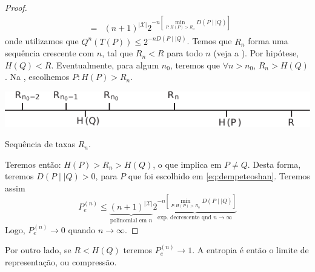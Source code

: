 \begin{proof}
\begin{subequations}
\begin{align}
        &=& (n+1)^{\vert \mathcal{X} \vert} 2^{-n [\min_{P: H(P) > R_n} D(P \mid\mid Q)]} \label{eq:dempeteoshan}
  \end{align}
\end{subequations}
onde utilizamos que $Q^n(T(P)) \leq 2^{-n D(P\mid \mid Q)}$.
Temos que $R_n$ forma uma sequência crescente com $n$, tal que $R_n < R$ para todo $n$ (veja a ).
Por hipótese, $H(Q) < R$. Eventualmente, para algum $n_0$, teremos que $\forall n > n_0$, $R_n > H(Q)$.
Na , escolhemos $P: H(P) > R_n$.
\begin{marginfigure}%
  \includegraphics[width=\linewidth]{figures/Rn-seq.pdf}
  \caption{Sequência de taxas $R_n$.}
  \label{fig:Rn-seq}
\end{marginfigure}
Teremos então: $H(P) > R_n > H(Q)$, o que implica em $P \neq Q$.
Desta forma, teremos $D(P \mid\mid Q) > 0$, para $P$ que foi escolhido em \ref{eq:dempeteoshan}.
Teremos assim
\begin{equation}
  P_e^{(n)} \leq \underbrace{(n+1)^{\vert \mathcal{X} \vert}}_{\text{polinomial em } n} \underbrace{ 2^{-n [\min_{P: H(P) > R_n} D(P \mid\mid Q)]} }_{\text{exp. decrescente qnd } n \rightarrow \infty}
\end{equation}
Logo, $P_e^{(n)} \rightarrow 0$ quando $n \rightarrow \infty$.
\end{proof}
Por outro lado, se $R < H(Q)$ teremos $P_e^{(n)} \rightarrow 1$.
A entropia é então o limite de representação, ou compressão.
